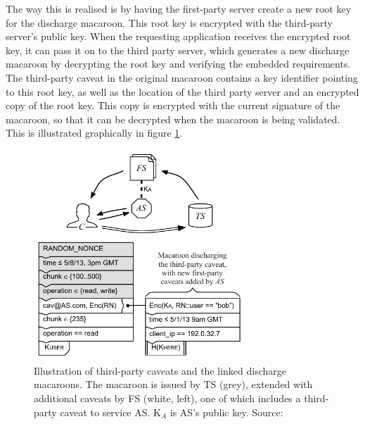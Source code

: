 The way this is realised is by having the first-party server create a new root key for the discharge macaroon. This root key is encrypted with the third-party server's public key. When the requesting application receives the encrypted root key, it can pass it on to the third party server, which generates a new discharge macaroon by decrypting the root key and verifying the embedded requirements. The third-party caveat in the original macaroon contains a key identifier pointing to this root key, as well as the location of the third party server and an encrypted copy of the root key. This copy is encrypted with the current signature of the macaroon, so that it can be decrypted when the macaroon is being validated.
This is illustrated graphically in figure \ref{fig:macaroon-third-party-caveats}.

\begin{figure}[H]
     \centering
     \includegraphics[width=0.75\textwidth]{images/macaroons/third-party-caveat.png}
     \caption{Illustration of third-party caveats and the linked discharge macaroons. The macaroon is issued by TS (grey), extended with additional caveats by FS (white, left), one of which includes a third-party caveat to service AS. K$_A$ is AS's public key. Source: \citet{macaroons}}
     \label{fig:macaroon-third-party-caveats}
\end{figure}

